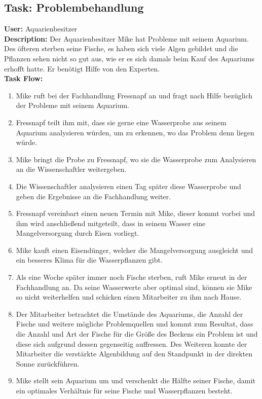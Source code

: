 \subsection{\textbf{Task:} Problembehandlung}
\textbf{User:} Aquarienbesitzer\\

\textbf{Description:} Der Aquarienbesitzer Mike hat Probleme mit seinem Aquarium. Des öfteren sterben seine Fische, es haben sich viele Algen gebildet und die Pflanzen sehen nicht so gut aus, wie er es sich damals beim Kauf des Aquariums erhofft hatte. Er benötigt Hilfe von den Experten.\\

\textbf{Task Flow:}
\begin{enumerate}
\item Mike ruft bei der Fachhandlung Fressnapf an und fragt nach Hilfe bezüglich der Probleme mit seinem Aquarium. 
 \item Fressnapf teilt ihm mit, dass sie gerne eine Wasserprobe aus seinem Aquarium analysieren würden, um zu erkennen, wo das Problem denn liegen würde.
 \item Mike bringt die Probe zu Fressnapf, wo sie die Wasserprobe zum Analysieren an die Wissenschaftler weitergeben.
 \item Die Wissenschaftler analysieren einen Tag später diese Wasserprobe und geben die Ergebnisse an die Fachhandlung weiter.
 \item Fressnapf vereinbart einen neuen Termin mit Mike, dieser kommt vorbei und ihm wird anschließend mitgeteilt, dass in seinem Wasser eine Mangelversorgung durch Eisen vorliegt. 
 \item Mike kauft einen Eisendünger, welcher die Mangelversorgung ausgleicht und ein besseres Klima für die Wasserpflanzen gibt.
 \item Als eine Woche später immer noch Fische sterben, ruft Mike erneut in der Fachhandlung an. Da seine Wasserwerte aber optimal sind, können sie Mike so nicht weiterhelfen und schicken einen Mitarbeiter zu ihm nach Hause.
 \item Der Mitarbeiter betrachtet die Umstände des Aquariums, die Anzahl der Fische und weitere mögliche Problemquellen und kommt zum Resultat, dass die Anzahl und Art der Fische für die Größe des Beckens ein Problem ist und diese sich aufgrund dessen gegenseitig auffressen. Des Weiteren konnte der Mitarbeiter die verstärkte Algenbildung auf den Standpunkt in der direkten Sonne zurückführen.
 \item Mike stellt sein Aquarium um und verschenkt die Hälfte seiner Fische, damit ein optimales Verhältnis für seine Fische und Wasserpflanzen besteht.
\end{enumerate}


